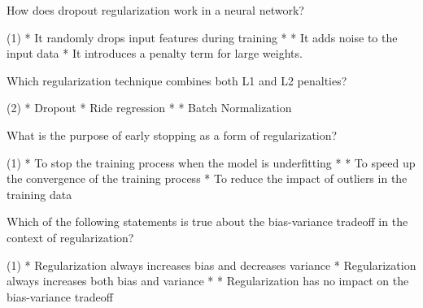 \documentclass[10pt]{extarticle}
\begin{document}
\begin{exercise}
    How does dropout regularization work in a neural network?
    \begin{choice}(1)
        * It randomly drops input features during training
        * 
        * It adds noise to the input data
        * It introduces a penalty term for large weights.
    \end{choice}
\end{exercise}
\begin{solution}
\end{solution}

\begin{exercise}
    Which regularization technique combines both L1 and L2 penalties?
    \begin{choice} (2)
        * Dropout
        * Ride regression
        * 
        * Batch Normalization
    \end{choice}
\end{exercise}
\begin{solution}
\end{solution}

\begin{exercise}
    What is the purpose of early stopping as a form of regularization?
    \begin{choice} (1)
        * To stop the training process when the model is underfitting
        * 
        * To speed up the convergence of the training process
        * To reduce the impact of outliers in the training data
    \end{choice}
\end{exercise}
\begin{solution}
\end{solution}

\begin{exercise}
    Which of the following statements is true about the bias-variance tradeoff in the context of regularization?
    \begin{choice} (1)
        * Regularization always increases bias and decreases variance
        * Regularization always increases both bias and variance
        * 
        * Regularization has no impact on the bias-variance tradeoff
    \end{choice}
\end{exercise}
\begin{solution}
\end{solution}
\end{document}
